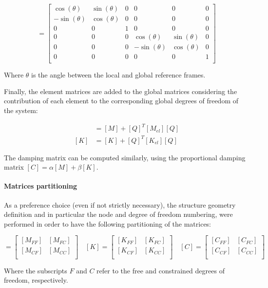 \begin{equation}
    [Q] = \begin{bmatrix}
        \cos(\theta)  & \sin(\theta) & 0 & 0             & 0            & 0 \\
        -\sin(\theta) & \cos(\theta) & 0 & 0             & 0            & 0 \\
        0             & 0            & 1 & 0             & 0            & 0 \\
        0             & 0            & 0 & \cos(\theta)  & \sin(\theta) & 0 \\
        0             & 0            & 0 & -\sin(\theta) & \cos(\theta) & 0 \\
        0             & 0            & 0 & 0             & 0            & 1 \\
    \end{bmatrix}
\end{equation}

Where $\theta$ is the angle between the local and global reference frames.

Finally, the element matrices are added to the global matrices considering the contribution of each element to the corresponding global degrees of freedom of the system:

\begin{align}
    [M] & = [M] + [Q]^T [M_{el}] [Q] \\
    [K] & = [K] + [Q]^T [K_{el}] [Q]
\end{align}

The damping matrix can be computed similarly, using the proportional damping matrix $[C] = \alpha [M] + \beta [K]$.

\paragraph{Matrices partitioning}

As a preference choice (even if not strictly necessary), the structure geometry definition and in particular the node and degree of freedom numbering, were performed in order to have the following partitioning of the matrices:

\begin{equation}
    [M] = \begin{bmatrix}
        [M_{FF}] & [M_{FC}] \\
        [M_{CF}] & [M_{CC}] \\
    \end{bmatrix}
    \quad
    [K] = \begin{bmatrix}
        [K_{FF}] & [K_{FC}] \\
        [K_{CF}] & [K_{CC}] \\
    \end{bmatrix}
    \quad
    [C] = \begin{bmatrix}
        [C_{FF}] & [C_{FC}] \\
        [C_{CF}] & [C_{CC}] \\
    \end{bmatrix}
\end{equation}

Where the subscripts $F$ and $C$ refer to the free and constrained degrees of freedom, respectively.
